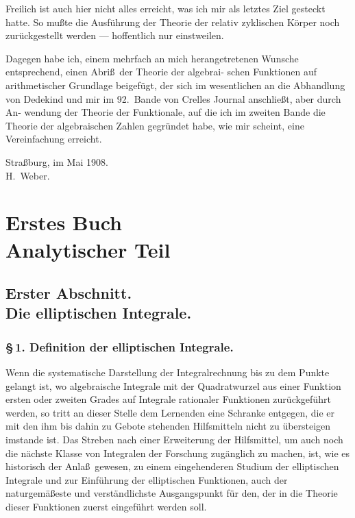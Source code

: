\documentclass[12pt,a4paper]{book}
\theoremstyle{definition}
\begin{document}
Freilich ist auch hier nicht alles erreicht, was ich mir als letztes Ziel gesteckt hatte. So mu\ss te die Ausf\"uhrung der Theorie der relativ zyklischen K\"orper noch zur\"uckgestellt werden --- hoffentlich nur einstweilen.

Dagegen habe ich, einem mehrfach an mich herangetretenen
Wunsche entsprechend, einen Abri\ss\ der Theorie der algebrai-
schen Funktionen auf arithmetischer Grundlage beigef\"ugt, der
sich im wesentlichen an die Abhandlung von Dedekind und mir
im 92.\ Bande von Crelles Journal anschlie\ss t, aber durch An-
wendung der Theorie der Funktionale, auf die ich im zweiten
Bande die Theorie der algebraischen Zahlen gegr\"undet habe, wie
mir scheint, eine Vereinfachung erreicht.

\vspace{1cm}
\begin{flushright}
Stra\ss burg, im Mai 1908.\\
H.\ Weber.
\end{flushright}

\cleardoublepage

\tableofcontents
\cleardoublepage

\mainmatter

\part*{Erstes Buch\\Analytischer Teil}

\chapter*{Erster Abschnitt.\\Die elliptischen Integrale.}

\section*{\S\,1. Definition der elliptischen Integrale.}

Wenn die systematische Darstellung der Integralrechnung bis
zu dem Punkte gelangt ist, wo algebraische Integrale mit der
Quadratwurzel aus einer Funktion ersten oder zweiten Grades
auf Integrale rationaler Funktionen zur\"uckgef\"uhrt werden, so tritt
an dieser Stelle dem Lernenden eine Schranke entgegen, die er
mit den ihm bis dahin zu Gebote stehenden Hilfsmitteln nicht
zu \"ubersteigen imstande ist. Das Streben nach einer Erweiterung
der Hilfsmittel, um auch noch die n\"achste Klasse von Integralen
der Forschung zug\"anglich zu machen, ist, wie es historisch der
Anla\ss\ gewesen, zu einem eingehenderen Studium der elliptischen
Integrale und zur Einf\"uhrung der elliptischen Funktionen, auch
der naturgem\"a\ss este und verst\"andlichste Ausgangspunkt f\"ur den,
der in die Theorie dieser Funktionen zuerst eingef\"uhrt werden
soll.
\end{document}
